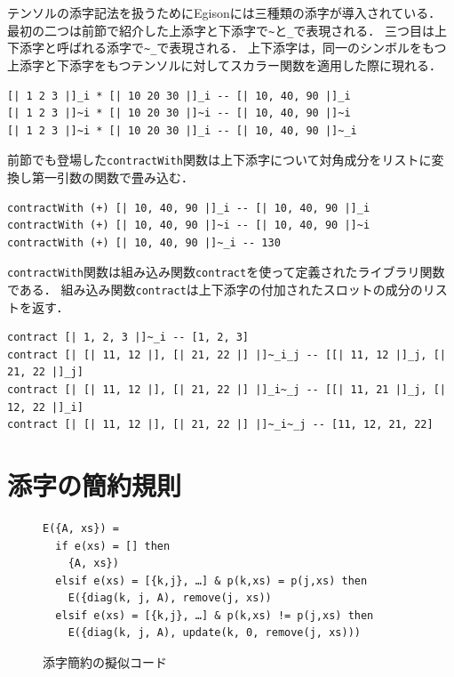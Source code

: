 テンソルの添字記法を扱うためにEgisonには三種類の添字が導入されている．
最初の二つは前節で紹介した上添字と下添字で\lstinline{~}と\lstinline{_}で表現される．
三つ目は上下添字と呼ばれる添字で\lstinline{~_}で表現される．
上下添字は，同一のシンボルをもつ上添字と下添字をもつテンソルに対してスカラー関数を適用した際に現れる．
\begin{lstlisting}[language=egison,numbers=none]
[| 1 2 3 |]_i * [| 10 20 30 |]_i -- [| 10, 40, 90 |]_i
[| 1 2 3 |]~i * [| 10 20 30 |]~i -- [| 10, 40, 90 |]~i
[| 1 2 3 |]~i * [| 10 20 30 |]_i -- [| 10, 40, 90 |]~_i
\end{lstlisting}

前節でも登場した\lstinline{contractWith}関数は上下添字について対角成分をリストに変換し第一引数の関数で畳み込む．
\begin{lstlisting}[language=egison,numbers=none]
contractWith (+) [| 10, 40, 90 |]_i -- [| 10, 40, 90 |]_i
contractWith (+) [| 10, 40, 90 |]~i -- [| 10, 40, 90 |]~i
contractWith (+) [| 10, 40, 90 |]~_i -- 130
\end{lstlisting}

\lstinline{contractWith}関数は組み込み関数\lstinline{contract}を使って定義されたライブラリ関数である．
組み込み関数\lstinline{contract}は上下添字の付加されたスロットの成分のリストを返す．
\begin{lstlisting}[language=egison,numbers=none]
contract [| 1, 2, 3 |]~_i -- [1, 2, 3]
contract [| [| 11, 12 |], [| 21, 22 |] |]~_i_j -- [[| 11, 12 |]_j, [| 21, 22 |]_j]
contract [| [| 11, 12 |], [| 21, 22 |] |]_i~_j -- [[| 11, 21 |]_j, [| 12, 22 |]_i]
contract [| [| 11, 12 |], [| 21, 22 |] |]~_i~_j -- [11, 12, 21, 22]
\end{lstlisting}

\section{添字の簡約規則}\label{tensor-rules}

\begin{figure}
  \begin{center}
\begin{lstlisting}[language=egison,numbers=none]
E({A, xs}) =
  if e(xs) = [] then
    {A, xs})
  elsif e(xs) = [{k,j}, …] & p(k,xs) = p(j,xs) then
    E({diag(k, j, A), remove(j, xs))
  elsif e(xs) = [{k,j}, …] & p(k,xs) != p(j,xs) then
    E({diag(k, j, A), update(k, 0, remove(j, xs)))
\end{lstlisting}
  \end{center}
  \caption{添字簡約の擬似コード}
  \label{fig:semanticsRules}
\end{figure}

